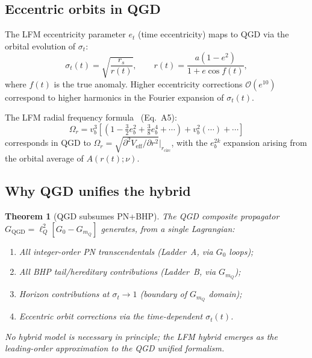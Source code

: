\documentclass[11pt,a4paper]{article}
\theoremstyle{plain}
\newtheorem{theorem}{Theorem}[section]
\theoremstyle{definition}
\theoremstyle{remark}
\newcommand{\lQ}{\ell_Q}
\newcommand{\mQ}{m_Q}
\newcommand{\sigt}{\sigma_t}
\begin{document}
\subsection{Eccentric orbits in QGD}

The LFM eccentricity parameter $e_t$ (time eccentricity) maps to QGD via the
orbital evolution of $\sigma_t$:
\begin{equation}
  \sigma_t(t) = \sqrt{\frac{r_s}{r(t)}},
  \qquad r(t) = \frac{a(1-e^2)}{1 + e\cos f(t)},
  \label{eq:eccentric_sigma}
\end{equation}
where $f(t)$ is the true anomaly.  Higher eccentricity corrections $\mathcal{O}(e^{10})$
correspond to higher harmonics in the Fourier expansion of $\sigma_t(t)$.

The LFM radial frequency formula~\cite{LFM2026} (Eq.~A5):
\begin{equation}
  \Omega_r = v_b^3\!\left[\left(1 - \tfrac{3}{2}e_b^2 + \tfrac{3}{8}e_b^4 + \cdots\right)
    + v_b^2(\cdots) + \cdots\right]
  \label{eq:Omega_r_LFM}
\end{equation}
corresponds in QGD to $\Omega_r = \sqrt{\partial^2 V_{\mathrm{eff}}/\partial r^2}|_{r_{\mathrm{circ}}}$,
with the $e_b^{2k}$ expansion arising from the orbital average of $A(r(t);\nu)$.

\subsection{Why QGD unifies the hybrid}

\begin{theorem}[QGD subsumes PN+BHP]\label{thm:subsume}
The QGD composite propagator
$G_{\mathrm{QGD}} = \lQ^2[G_0 - G_{\mQ}]$ generates, from a single Lagrangian:
\begin{enumerate}[noitemsep]
  \item All integer-order PN transcendentals (Ladder~A, via $G_0$ loops);
  \item All BHP tail/hereditary contributions (Ladder~B, via $G_{\mQ}$);
  \item Horizon contributions at $\sigt \to 1$ (boundary of $G_{\mQ}$ domain);
  \item Eccentric orbit corrections via the time-dependent $\sigma_t(t)$.
\end{enumerate}
No hybrid model is necessary in principle; the LFM hybrid emerges as the
leading-order approximation to the QGD unified formalism.
\end{theorem}

\end{document}
